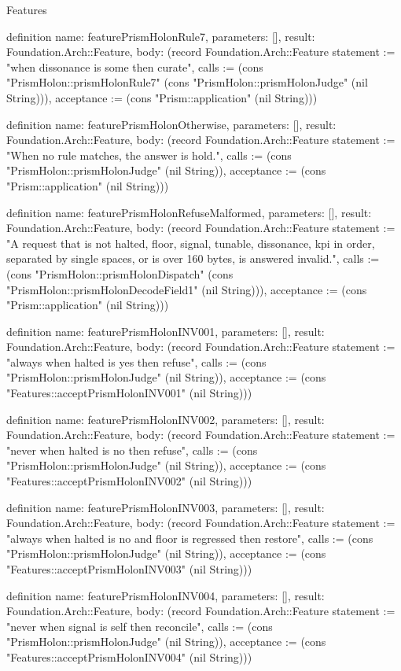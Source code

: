 \begin{lexlean}{Features}
\begin{semanticmodule}
definition{
  name: featurePrismHolonRule7,
  parameters: [],
  result: Foundation.Arch::Feature,
  body: (record Foundation.Arch::Feature {statement := "when dissonance is some then curate", calls := (cons "PrismHolon::prismHolonRule7" (cons "PrismHolon::prismHolonJudge" (nil String))), acceptance := (cons "Prism::application" (nil String))})
}

definition{
  name: featurePrismHolonOtherwise,
  parameters: [],
  result: Foundation.Arch::Feature,
  body: (record Foundation.Arch::Feature {statement := "When no rule matches, the answer is hold.", calls := (cons "PrismHolon::prismHolonJudge" (nil String)), acceptance := (cons "Prism::application" (nil String))})
}

definition{
  name: featurePrismHolonRefuseMalformed,
  parameters: [],
  result: Foundation.Arch::Feature,
  body: (record Foundation.Arch::Feature {statement := "A request that is not halted, floor, signal, tunable, dissonance, kpi in order, separated by single spaces, or is over 160 bytes, is answered invalid.", calls := (cons "PrismHolon::prismHolonDispatch" (cons "PrismHolon::prismHolonDecodeField1" (nil String))), acceptance := (cons "Prism::application" (nil String))})
}

definition{
  name: featurePrismHolonINV001,
  parameters: [],
  result: Foundation.Arch::Feature,
  body: (record Foundation.Arch::Feature {statement := "always when halted is yes then refuse", calls := (cons "PrismHolon::prismHolonJudge" (nil String)), acceptance := (cons "Features::acceptPrismHolonINV001" (nil String))})
}

definition{
  name: featurePrismHolonINV002,
  parameters: [],
  result: Foundation.Arch::Feature,
  body: (record Foundation.Arch::Feature {statement := "never when halted is no then refuse", calls := (cons "PrismHolon::prismHolonJudge" (nil String)), acceptance := (cons "Features::acceptPrismHolonINV002" (nil String))})
}

definition{
  name: featurePrismHolonINV003,
  parameters: [],
  result: Foundation.Arch::Feature,
  body: (record Foundation.Arch::Feature {statement := "always when halted is no and floor is regressed then restore", calls := (cons "PrismHolon::prismHolonJudge" (nil String)), acceptance := (cons "Features::acceptPrismHolonINV003" (nil String))})
}

definition{
  name: featurePrismHolonINV004,
  parameters: [],
  result: Foundation.Arch::Feature,
  body: (record Foundation.Arch::Feature {statement := "never when signal is self then reconcile", calls := (cons "PrismHolon::prismHolonJudge" (nil String)), acceptance := (cons "Features::acceptPrismHolonINV004" (nil String))})
}


\end{semanticmodule}
\end{lexlean}
